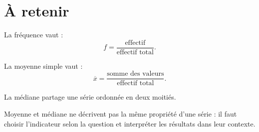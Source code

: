 \section{À retenir}

\begin{aretenir}
La fréquence vaut :
\[
\boxed{f=\dfrac{\text{effectif}}{\text{effectif total}}}.
\]

La moyenne simple vaut :
\[
\boxed{\overline{x}=\dfrac{\text{somme des valeurs}}{\text{effectif total}}}.
\]

La médiane partage une série ordonnée en deux moitiés.

Moyenne et médiane ne décrivent pas la même propriété d'une série : il faut choisir l'indicateur selon la question et interpréter les résultats dans leur contexte.
\end{aretenir}
